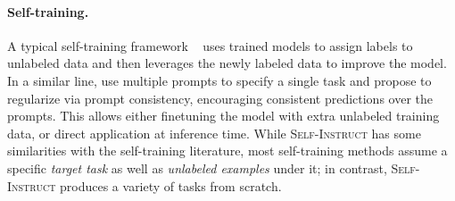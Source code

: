 \documentclass[11pt]{article}
\newcommand{\nascomment}[1]{\textcolor{blue}{\textbf{[#1 -- \textsc{nas}]}}}
\newcommand{\name}{\textsc{Self-Instruct}}
\begin{document}
\paragraph{Self-training.}
A typical self-training framework ~\cite{he2019revisiting, xie2020self, du2021self, amini2022self, huang2022large} uses trained models to assign labels to unlabeled data and then leverages the newly labeled data to improve the model. In a similar line, \citet {zhou2022prompt} use multiple prompts to specify a single task and propose
to regularize via prompt consistency, encouraging
consistent predictions over the
prompts. This allows either 
finetuning the model  with extra unlabeled
training data, or direct application at inference time.
While \name{} has some similarities with the self-training literature, most self-training methods assume a specific \textit{target task} as well as \textit{unlabeled examples} under it; in contrast, \name{} produces a variety of tasks from scratch.





\end{document}
